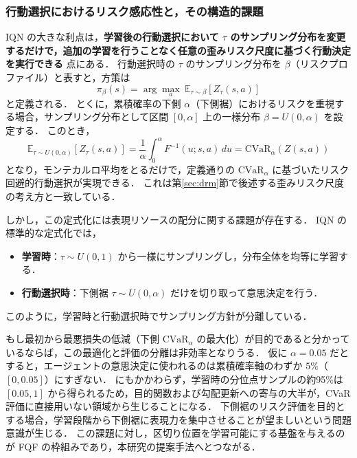 \documentclass[a4paper,10pt]{jsarticle}
\theoremstyle{definition}
\newcommand{\CVaR}{\mathrm{CVaR}}
\renewcommand{\Finv}{F^{-1}}
\newcommand{\E}{\mathbb{E}}
\begin{document}
\subsubsection{行動選択におけるリスク感応性と，その構造的課題}
IQN の大きな利点は，\textbf{学習後の行動選択において $\tau$ のサンプリング分布を変更するだけで，追加の学習を行うことなく任意の歪みリスク尺度に基づく行動決定を実行できる} 点にある．
行動選択時の $\tau$ のサンプリング分布を $\beta$（リスクプロファイル）と表すと，方策は
\begin{equation}
  \pi_\beta(s) = \arg\max_a\ \E_{\tau\sim\beta}\left[Z_\tau(s,a)\right]
  \label{eq:iqn-risk-policy}
\end{equation}
と定義される．
とくに，累積確率の下側 $\alpha$（下側裾）におけるリスクを重視する場合，サンプリング分布として区間 $[0, \alpha]$ 上の一様分布 $\beta = U(0, \alpha)$ を設定する．
このとき，
\begin{equation}
  \E_{\tau\sim U(0,\alpha)}\left[Z_\tau(s, a)\right] = \frac{1}{\alpha}\int_0^\alpha \Finv(u; s, a)\,du = \CVaR_\alpha(Z(s, a))
\end{equation}
となり，モンテカルロ平均をとるだけで，定義通りの $\CVaR_\alpha$ に基づいたリスク回避的行動選択が実現できる．
これは第\ref{sec:drm}節で後述する歪みリスク尺度の考え方と一致している．

しかし，この定式化には表現リソースの配分に関する課題が存在する．
IQN の標準的な定式化では，
\begin{itemize}
  \item \textbf{学習時}：$\tau \sim U(0, 1)$ から一様にサンプリングし，分布全体を均等に学習する．
  \item \textbf{行動選択時}：下側裾 $\tau \sim U(0, \alpha)$ だけを切り取って意思決定を行う．
\end{itemize}
このように，学習時と行動選択時でサンプリング方針が分離している．

もし最初から最悪損失の低減（下側 $\CVaR_\alpha$ の最大化）が目的であると分かっているならば，この最適化と評価の分離は非効率となりうる．
仮に $\alpha=0.05$ だとすると，エージェントの意思決定に使われるのは累積確率軸のわずか $5\%$（$[0, 0.05]$）にすぎない．
にもかかわらず，学習時の分位点サンプルの約95\%は $[0.05, 1]$ から得られるため，目的関数および勾配更新への寄与の大半が，CVaR 評価に直接用いない領域から生じることになる．
下側裾のリスク評価を目的とする場合，学習段階から下側裾に表現力を集中させることが望ましいという問題意識が生じる．
この課題に対し，区切り位置を学習可能にする基盤を与えるのが FQF の枠組みであり，本研究の提案手法へとつながる．
\end{document}
